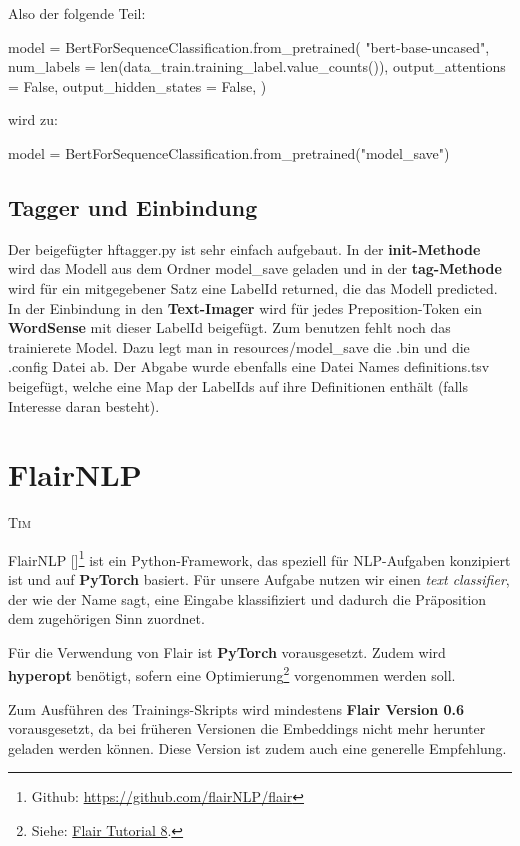 \documentclass[10pt,a4paper]{article}
\newcommand{\chapterauthor}[1]{%
	{\parindent0pt\vspace*{-5pt}\hspace*{\fill}%
  \linespread{1.1}\large\scshape#1%
  \par\nobreak\vspace*{10pt}}
}
\begin{document}
Also der folgende Teil:
\begin{python}
model = BertForSequenceClassification.from_pretrained(
    "bert-base-uncased", 
    num_labels = len(data_train.training_label.value_counts()), 
    output_attentions = False, 
    output_hidden_states = False, 
)
\end{python}
wird zu:
\begin{python}
model = BertForSequenceClassification.from_pretrained("model_save")
\end{python}


\subsection{Tagger und Einbindung}
Der beigefügter hftagger.py ist sehr einfach aufgebaut. In der \textbf{init-Methode} wird das Modell aus dem Ordner model\_save geladen und in der \textbf{tag-Methode} wird für ein mitgegebener Satz eine LabelId returned, die das Modell predicted. In der Einbindung in den \textbf{Text-Imager} wird für jedes Preposition-Token ein \textbf{WordSense} mit dieser LabelId beigefügt. Zum benutzen fehlt noch das trainierete Model. Dazu legt man in resources/model\_save die .bin und die .config Datei ab. Der Abgabe wurde ebenfalls eine Datei Names definitions.tsv beigefügt, welche eine Map der LabelIds auf ihre Definitionen enthält (falls Interesse daran besteht).

\newpage

\section{FlairNLP}
\chapterauthor{Tim}
\begin{flushleft}
FlairNLP [\cite{flair}]\footnote{Github: \url{https://github.com/flairNLP/flair}} ist ein Python-Framework, das speziell für NLP-Aufgaben konzipiert ist und auf \textbf{PyTorch} basiert. Für unsere Aufgabe nutzen wir einen \textit{text classifier}, der wie der Name sagt, eine Eingabe klassifiziert und dadurch die Präposition dem zugehörigen Sinn zuordnet.

Für die Verwendung von Flair ist \textbf{PyTorch} vorausgesetzt. Zudem wird \textbf{hyperopt} benötigt, sofern eine Optimierung\footnote{Siehe: \href{https://github.com/flairNLP/flair/blob/master/resources/docs/TUTORIAL_8_MODEL_OPTIMIZATION.md}{Flair Tutorial 8}.} vorgenommen werden soll.

Zum Ausführen des Trainings-Skripts wird mindestens \textbf{Flair Version 0.6} vorausgesetzt, da bei früheren Versionen die Embeddings nicht mehr herunter geladen werden können. Diese Version ist zudem auch eine generelle Empfehlung.
\end{flushleft}
\end{document}
